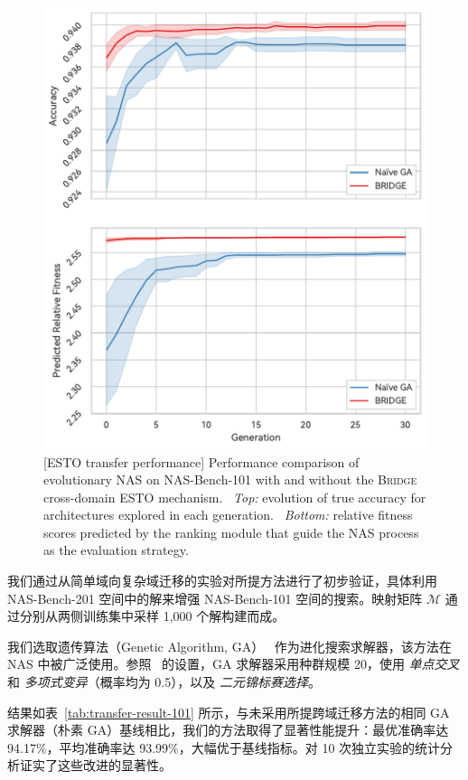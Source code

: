 \documentclass[../main.tex]{subfiles}
\begin{document}
\label{sec:ch4-8-3-simple-to-complex-transfer}

\begin{figure}
	\centering
	\includegraphics[width=.67\linewidth]{BRIDGE/search-plot.pdf}
	[ESTO transfer performance]{
		Performance comparison of evolutionary NAS on NAS-Bench-101 with and without the \textsc{Bridge} cross-domain ESTO mechanism.
		\ \textit{Top:} evolution of true accuracy for architectures explored in each generation.
		\ \textit{Bottom:} relative fitness scores predicted by the ranking module that guide the NAS process as the evaluation strategy.
	}\label{fig:search-process-plot}
\end{figure}

我们通过从简单域向复杂域迁移的实验对所提方法进行了初步验证，具体利用 NAS-Bench-201 空间中的解来增强 NAS-Bench-101 空间的搜索。映射矩阵 \( \mathcal{M} \) 通过分别从两侧训练集中采样 1,000 个解构建而成。

我们选取遗传算法（Genetic Algorithm, GA）~\cite{geneticalgorithms_holland_1992} 作为进化搜索求解器，该方法在 NAS 中被广泛使用。参照~\cite{efficienttwostage_hou_2021} 的设置，GA 求解器采用种群规模 20，使用 \textit{单点交叉} 和 \textit{多项式变异}（概率均为 0.5），以及 \textit{二元锦标赛选择}。

结果如表~\ref{tab:transfer-result-101} 所示，与未采用所提跨域迁移方法的相同 GA 求解器（朴素 GA）基线相比，我们的方法取得了显著性能提升：最优准确率达 94.17\%，平均准确率达 93.99\%，大幅优于基线指标。对 10 次独立实验的统计分析证实了这些改进的显著性。
\end{document}
